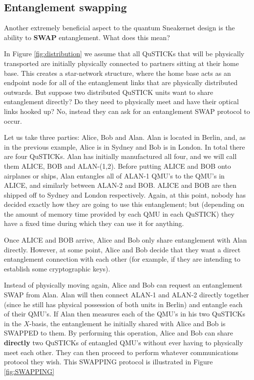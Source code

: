 \documentclass[twocolumn, aps, rmp, amsmath, amssymb, nofootinbib, superscriptaddress, longbibliography, floatfix, table-of-contents, eqsecnum]{revtex4-2}
\begin{document}
\subsection{Entanglement swapping}

Another extremely beneficial aspect to the quantum Sneakernet design is the ability to \textbf{SWAP} entanglement. What does this mean? 

In Figure \ref{fig:distribution} we assume that all QuSTICKs that will be physically transported are initially physically connected to partners sitting at their home base. This creates a star-network structure, where the home base acts as an endpoint node for all of the entanglement links that are physically distributed outwards. But suppose two distributed QuSTICK units want to share entanglement directly? Do they need to physically meet and have their optical links hooked up? No, instead they can ask for an entanglement SWAP protocol to occur. 

Let us take three parties: Alice, Bob and Alan. Alan is located in Berlin, and, as in the previous example, Alice is in Sydney and Bob is in London. In total there are four QuSTICKs. Alan has initially manufactured all four, and we will call them ALICE, BOB and ALAN-(1,2). Before putting ALICE and BOB onto airplanes or ships, Alan entangles all of ALAN-1 QMU's to the QMU's in ALICE, and similarly between ALAN-2 and BOB. ALICE and BOB are then shipped off to Sydney and London respectively. Again, at this point, nobody has decided exactly how they are going to use this entanglement; but (depending on the amount of memory time provided by each QMU in each QuSTICK) they have a fixed time during which they can use it for anything. 

Once ALICE and BOB arrive, Alice and Bob only share entanglement with Alan directly. However, at some point, Alice and Bob decide that they want a direct entanglement connection with each other (for example, if they are intending to establish some cryptographic keys).

Instead of physically moving again, Alice and Bob can request an entanglement SWAP from Alan. Alan will then connect ALAN-1 and ALAN-2 directly together (since he still has physical possession of both units in Berlin) and entangle each of their QMU's. If Alan then measures each of the QMU's in his two QuSTICKs in the $X$-basis, the entanglement he initially shared with Alice and Bob is SWAPPED to them. By performing this operation, Alice and Bob can share \textbf{directly} two QuSTICKs of entangled QMU's without ever having to physically meet each other. They can then proceed to perform whatever communications protocol they wish. This SWAPPING protocol is illustrated in Figure \ref{fig:SWAPPING} 
\end{document}
